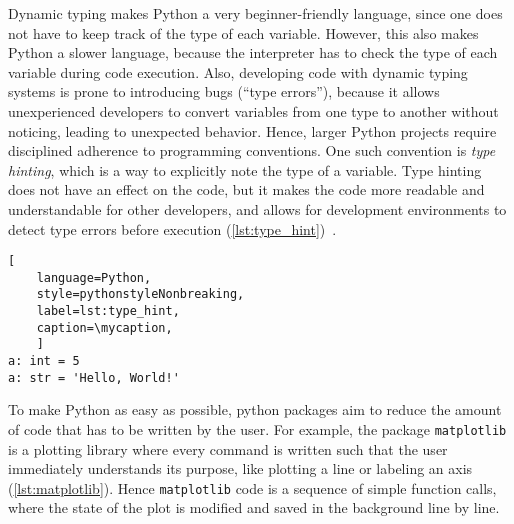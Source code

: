 Dynamic typing makes Python a very beginner-friendly language, since one does
not have to keep track of the type of each variable. However, this also makes
Python a slower language, because the interpreter has to check the type of each
variable during code execution. Also, developing code with dynamic typing
systems is prone to introducing bugs (``type errors''), because it allows
unexperienced developers to convert variables from one type to another without
noticing, leading to unexpected behavior. Hence, larger Python projects require
disciplined adherence to programming conventions. One such convention is
\textit{type hinting}, which is a way to explicitly note the type of a
variable. Type hinting does not have an effect on the code, but it makes the
code more readable and understandable for other developers, and allows for
development environments to detect type errors before execution
(\autoref{lst:type_hint})~\cite{vanrossumPEP484Type2014}.

\def\mycaption{ Example of type hints used in Python. Explicitly stating the
    type of the variable is optional and does not change the behavior of the
    code, but behaves exactly as shown in \autoref{lst:dynamic_typing}.}
\begin{lstlisting}[
    language=Python,
    style=pythonstyleNonbreaking,
    label=lst:type_hint,
    caption=\mycaption,
    ]
a: int = 5
a: str = 'Hello, World!'
\end{lstlisting}



To make Python as easy as possible, python packages aim to reduce the amount of
code that has to be written by the user. For example, the package
\texttt{matplotlib} is a plotting library where every command is written such
that the user immediately understands its purpose, like plotting a line or
labeling an axis (\autoref{lst:matplotlib}). Hence \texttt{matplotlib} code is a
sequence of simple function calls, where the state of the plot is modified and
saved in the background line by line.

